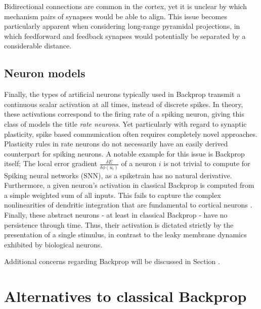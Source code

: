 Bidirectional connections are common in the cortex, yet it is unclear by which mechanism pairs of synapses would be able
to align. This issue becomes particularly apparent when considering long-range pyramidal projections, in which
feedforward and feedback synapses would potentially be separated by a considerable distance.

\subsection{Neuron models}

Finally, the types of artificial neurons typically used in Backprop transmit a continuous scalar activation at all
times, instead of discrete spikes. In theory, these activations correspond to the firing rate of a spiking neuron,
giving this class of models the title \textit{rate neurons}. Yet particularly with regard to synaptic plasticity, spike
based communication often requires completely novel approaches. Plasticity rules in rate neurons do not necessarily have
an easily derived counterpart for spiking neurons. A notable example for this issue is Backprop itself; The local error
gradient $\frac{\delta E}{\delta \phi(u_i)}$ of a neuron $i$  is not trivial to compute for Spiking neural networks
(SNN), as a spiketrain has no natural derivative. Furthermore, a given neuron's activation in classical Backprop is
computed from a simple weighted sum of all inputs. This fails to capture the complex nonlinearities of dendritic
integration that are fundamental to cortical neurons \citep{Gerstner2009,sjostrom2008dendritic,Eyal2018}. Finally, these
abstract neurons - at least in classical Backprop - have no persistence through time. Thus, their activation is dictated
strictly by the presentation of a single stimulus, in contrast to the leaky membrane dynamics exhibited by biological
neurons.\newline

Additional concerns regarding Backprop will be discussed in Section \todo{}.


\section{Alternatives to classical Backprop}

